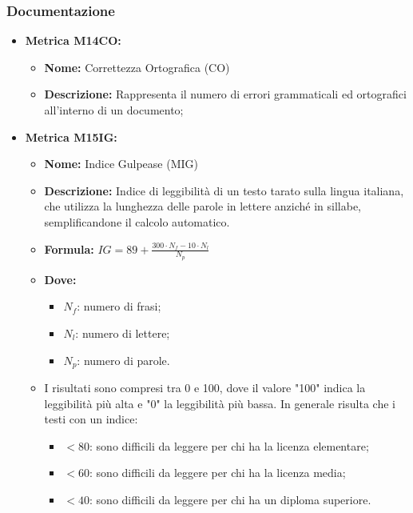 \subsubsection{Documentazione}
\begin{itemize}
    \item \textbf{Metrica M14CO:}
          \begin{itemize}
              \item \textbf{Nome:} Correttezza Ortografica (CO)
              \item \textbf{Descrizione:} Rappresenta il numero di errori grammaticali ed
              ortografici all'interno di un documento;
          \end{itemize}
          \item \textbf{Metrica M15IG:}
          \begin{itemize}
              \item \textbf{Nome:} Indice Gulpease (MIG)
              \item \textbf{Descrizione:} Indice di leggibilità di un testo tarato sulla lingua italiana, che utilizza la lunghezza delle parole in lettere anziché in sillabe, semplificandone il calcolo automatico.
              \item \textbf{Formula:} $IG = 89 + \frac{300 \cdot N_f - 10 \cdot N_l}{N_p}$
              \item \textbf{Dove:}
                    \begin{itemize}
                        \item $N_f$: numero di frasi;
                        \item $N_l$: numero di lettere;
                        \item $N_p$: numero di parole.
                    \end{itemize}
              \item I risultati sono compresi tra 0 e 100, dove il valore "100" indica la leggibilità più alta e "0" la leggibilità più bassa. In generale risulta che i testi con un indice:
                    \begin{itemize}
                        \item $< 80$: sono difficili da leggere per chi ha la licenza elementare;
                        \item $< 60$: sono difficili da leggere per chi ha la licenza media;
                        \item $< 40$: sono difficili da leggere per chi ha un diploma superiore.
                    \end{itemize}
          \end{itemize}
        \end{itemize}

